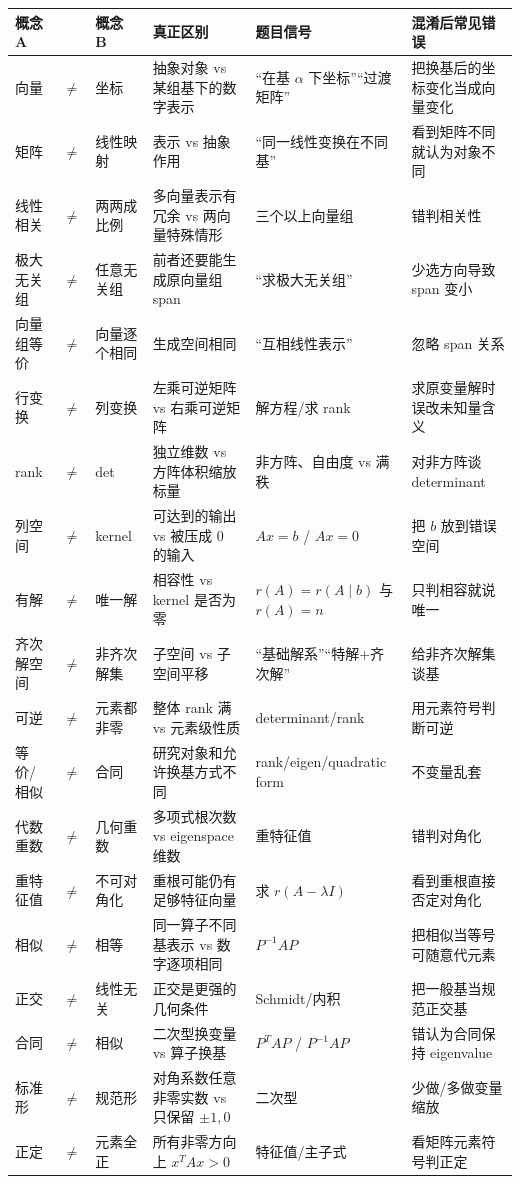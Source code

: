 \documentclass[11pt,a4paper,openany]{ctexbook}
\begin{document}
\begin{longtable}{L{1.7cm}@{}>{\centering\arraybackslash}p{0.35cm}@{}L{1.7cm}L{3.3cm}L{3.3cm}L{\dimexpr\linewidth-10.72cm\relax}}
\toprule
\textbf{概念 A} & & \textbf{概念 B} & \textbf{真正区别} & \textbf{题目信号} & \textbf{混淆后常见错误}\\
\midrule
向量 & $\neq$ & 坐标 & 抽象对象 vs 某组基下的数字表示 & “在基 $\alpha$ 下坐标”“过渡矩阵” & 把换基后的坐标变化当成向量变化\\
矩阵 & $\neq$ & 线性映射 & 表示 vs 抽象作用 & “同一线性变换在不同基” & 看到矩阵不同就认为对象不同\\
线性相关 & $\neq$ & 两两成比例 & 多向量表示有冗余 vs 两向量特殊情形 & 三个以上向量组 & 错判相关性\\
极大无关组 & $\neq$ & 任意无关组 & 前者还要能生成原向量组 span & “求极大无关组” & 少选方向导致 span 变小\\
向量组等价 & $\neq$ & 向量逐个相同 & 生成空间相同 & “互相线性表示” & 忽略 span 关系\\
行变换 & $\neq$ & 列变换 & 左乘可逆矩阵 vs 右乘可逆矩阵 & 解方程/求 rank & 求原变量解时误改未知量含义\\
rank & $\neq$ & det & 独立维数 vs 方阵体积缩放标量 & 非方阵、自由度 vs 满秩 & 对非方阵谈 determinant\\
列空间 & $\neq$ & kernel & 可达到的输出 vs 被压成 0 的输入 & $Ax=b$ / $Ax=0$ & 把 $b$ 放到错误空间\\
有解 & $\neq$ & 唯一解 & 相容性 vs kernel 是否为零 & $r(A)=r(A\mid b)$ 与 $r(A)=n$ & 只判相容就说唯一\\
齐次解空间 & $\neq$ & 非齐次解集 & 子空间 vs 子空间平移 & “基础解系”“特解+齐次解” & 给非齐次解集谈基\\
可逆 & $\neq$ & 元素都非零 & 整体 rank 满 vs 元素级性质 & determinant/rank & 用元素符号判断可逆\\
等价/相似 & $\neq$ & 合同 & 研究对象和允许换基方式不同 & rank/eigen/quadratic form & 不变量乱套\\
代数重数 & $\neq$ & 几何重数 & 多项式根次数 vs eigenspace 维数 & 重特征值 & 错判对角化\\
重特征值 & $\neq$ & 不可对角化 & 重根可能仍有足够特征向量 & 求 $r(A-\lambda I)$ & 看到重根直接否定对角化\\
相似 & $\neq$ & 相等 & 同一算子不同基表示 vs 数字逐项相同 & $P^{-1}AP$ & 把相似当等号可随意代元素\\
正交 & $\neq$ & 线性无关 & 正交是更强的几何条件 & Schmidt/内积 & 把一般基当规范正交基\\
合同 & $\neq$ & 相似 & 二次型换变量 vs 算子换基 & $P^TAP$ / $P^{-1}AP$ & 错认为合同保持 eigenvalue\\
标准形 & $\neq$ & 规范形 & 对角系数任意非零实数 vs 只保留 $\pm1,0$ & 二次型 & 少做/多做变量缩放\\
正定 & $\neq$ & 元素全正 & 所有非零方向上 $x^TAx>0$ & 特征值/主子式 & 看矩阵元素符号判正定\\
\bottomrule
\end{longtable}
\end{document}
